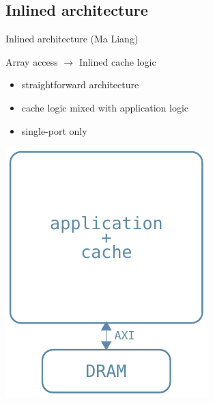 \documentclass{beamer}
\begin{document}
\subsection{Inlined architecture}
\begin{frame}{Inlined architecture (Ma Liang)}
	\begin{minipage}{.7\textwidth}
		\begin{center}
			Array access $\rightarrow$ Inlined cache logic
		\end{center}

		\bigskip

		\begin{itemize}
			\item straightforward architecture
			\item cache logic mixed with application logic
			\item single-port only
		\end{itemize}
	\end{minipage}
	\begin{minipage}{.28\textwidth}
		\begin{center}
			\includegraphics[width=.9\textwidth,height=.9\textheight,keepaspectratio]{liang_arch.pdf}
		\end{center}
	\end{minipage}
\end{frame}
\end{document}
